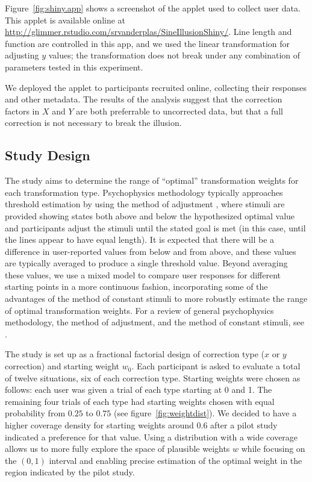 \documentclass[11pt]{isuthesis}\usepackage[]{graphicx}\usepackage[]{color}
\begin{document}
Figure~\ref{fig:shiny.app} shows a screenshot of the applet used to collect user data. This applet is  available online at \url{http://glimmer.rstudio.com/srvanderplas/SineIllusionShiny/}. 
Line length and function are controlled in this app, and we used the linear transformation for adjusting $y$ values; the transformation does not break under any combination of parameters tested in this experiment. 


\noindent
We deployed the applet to participants recruited online, collecting their responses and other metadata. The results of the analysis suggest that the correction factors in $X$ and $Y$ are both preferrable to uncorrected data, but that a full correction is not necessary to break the illusion.




\subsection{Study Design}
The study aims to determine the range of ``optimal'' transformation weights for each transformation type. Psychophysics methodology typically approaches threshold estimation by using the method of adjustment \citep{goldstein}, where  stimuli are provided showing states both above and below the hypothesized optimal value and  participants adjust the stimuli until the stated goal is met (in this case, until the lines appear to have equal length). It is expected that there will be a difference in user-reported values from below and from above, and these values are typically averaged to produce a single threshold value. Beyond averaging these values, we use a mixed model to compare user responses for different starting points in a more continuous fashion, incorporating some of the advantages of the method of constant stimuli to more robustly estimate the range of optimal transformation weights. For a review of general psychophysics methodology, the method of adjustment, and the method of constant stimuli, see \citet{goldstein}.

The study is set up as a fractional factorial design of correction type ($x$ or $y$ correction) and starting weight $w_0$. Each participant is asked to evaluate a total of twelve situations, six of each correction type.
Starting weights were chosen as follows: each user was given a trial of each type starting at 0 and 1. The remaining four trials of each type had starting weights chosen with equal probability from $0.25$ to $0.75$ 
(see figure~\ref{fig:weightdist}). 
We decided to  have a higher coverage density for starting weights around 0.6 after a pilot study indicated a preference for that value. Using a distribution with a wide coverage allows us to more fully explore the space of plausible weights $w$ while focusing on the $(0,1)$ interval and enabling precise estimation of the optimal weight in the region indicated by the pilot study.
\end{document}
